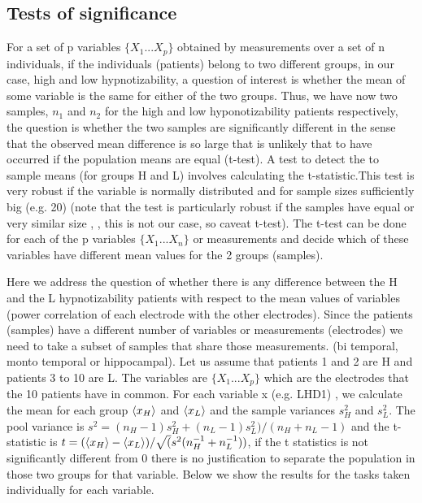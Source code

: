 \documentclass[11pt, onecolumn]{article}
\begin{document}
\subsection{Tests of significance}
For a set of p variables $\{X_1 ... X_p\}$ obtained by measurements over a set of n individuals, if the individuals (patients) belong to two different groups, in our case, high and low hypnotizability, a question of interest is whether the mean of some  variable is the same for either of the two groups. Thus, we have now two samples, $n_1$ and $n_2$ for the high and low hyponotizability patients respectively, the question is whether the two samples are significantly different in the sense that the observed mean difference is so large that is unlikely that to have occurred if the population means are equal (t-test). 
A test to detect the to sample means (for groups H and L) involves calculating the t-statistic.This test is very robust if the variable is normally distributed and for sample sizes sufficiently big (e.g. 20) (note that the test is particularly robust if the samples have equal or very similar size \citep{carter_effect_1979s},\citep{coombs_univariate_1996} , this is not our case, so caveat t-test). The t-test can be done for each of the p variables  $\{X_1 ... X_n\}$ or measurements and decide which of these variables have different mean values for the 2 groups (samples).

Here we address the question of whether there is any difference
between the H and the L hypnotizability patients with respect to the mean values of variables (power correlation of each electrode with the other electrodes). Since the patients (samples) have a different number of variables or measurements (electrodes) we need to take a subset of samples that share those measurements. (bi temporal, monto temporal or hippocampal).
Let us assume that patients 1 and 2 are H and patients 3 to 10 are L. The variables are 
$\{X_1 ... X_p\}$ which are the electrodes that the 10 patients have in common.
For each variable x (e.g. LHD1)
, we calculate the mean for each group $\left< x_H \right>$ and $\left< x_L \right>$ and the sample variances $s^2_H$ and $s^2_L$. The pool variance is $s^2= (n_H-1)s^2_H + (n_L-1)s^2_L)/(n_H+n_L -1)$ and the t-statistic is $t= (\left< x_H \right> - \left< x_L \right>)/\sqrt(s^2(n_H^{-1} + n_L^{-1}))$, if the t statistics is not significantly different from 0 there is no justification to separate the population in those two groups for that variable. Below we show the results for the tasks taken individually for each variable.
\end{document}
